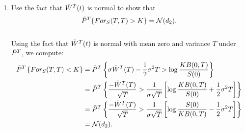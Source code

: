 \documentclass[11pt,a4,table]{article}
\begin{document}
\begin{enumerate}
\begin{enumerate}
        \item Use the fact that $\Tilde{W}^T(t)$ is normal to show that
        \begin{equation*}
            \Tilde{P}^T\{For_S(T,T)>K\} = \mathcal{N}(d_2).
        \end{equation*}\\
        Using the fact that $\Tilde{W}^T(t)$ is normal with mean zero and variance $T$ under $\Tilde{P}^T$, we compute:
        \begin{align*}
            \Tilde{P}^T\left\{For_S(T,T)<K\right\} &= \Tilde{P}^T \left\{\sigma\Tilde{W}^T(T) - \frac{1}{2}\sigma^2T > \log\frac{KB(0,T)}{S(0)}\right\} \\
            &= \Tilde{P}^T\left\{\frac{-\Tilde{W}^T(T)}{\sqrt{T}} > \frac{1}{\sigma\sqrt{T}}\left[\log\frac{KB(0,T)}{S(0)} + \frac{1}{2}\sigma^2 T\right]\right\} \\
            &= \Tilde{P}^T\left\{\frac{-\Tilde{W}^T(T)}{\sqrt{T}} > \frac{1}{\sigma\sqrt{T}} \left[\log\frac{S(0)}{KB(0,T)} - \frac{1}{2}\sigma^2T\right]\right\} \\
            &= \mathcal{N}(d_2).
        \end{align*}        
    \end{enumerate}
    
\end{enumerate}
\end{document}
